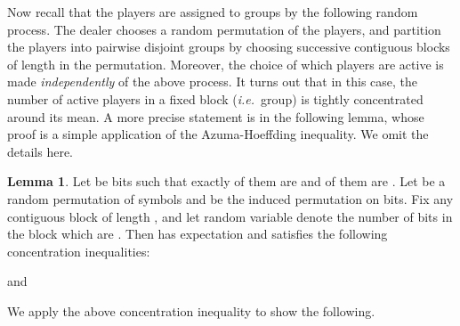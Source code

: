 \documentclass[12pt]{article}
\theoremstyle{definition}
\newtheorem{lemma}[theorem]{Lemma}
\newcommand{\ie}{\emph{i.e.}}
\begin{document}
Now recall that the players are assigned to groups by the 
following random process.  The dealer chooses a random permutation of the 
players, and partition the players into  
pairwise disjoint groups by choosing successive contiguous blocks of 
length  in the permutation. Moreover, the choice of which 
players are active is made \emph{independently} of the above process. 
It turns out that in this case, the number of active players in a 
fixed block (\ie \, group) is tightly
concentrated around its mean. A more precise statement is in the
following lemma, whose proof is a simple application of the Azuma-Hoeffding
inequality. We omit the details here.

\begin{lemma}\label{lem:conc}
Let  be  bits such that exactly  of them
are  and  of them are . Let  be a random
permutation of  symbols and  be the induced permutation on bits. Fix any
contiguous block  of length , and let random variable  denote 
the number of bits in the block which are . 
Then  has expectation  and satisfies the following 
concentration inequalities:

and

\end{lemma}

We apply the above concentration inequality to show the following.
\end{document}
